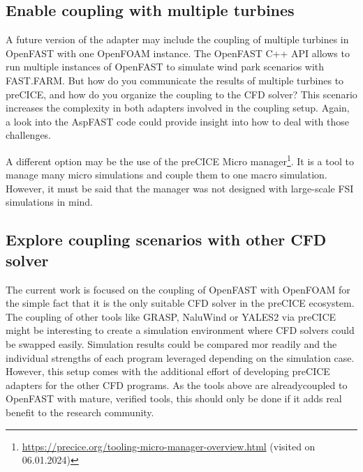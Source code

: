 \subsection{Enable coupling with multiple turbines}

A future version of the adapter may include the coupling of multiple turbines in OpenFAST with one OpenFOAM instance. The OpenFAST C++ API allows to run multiple instances of OpenFAST to simulate wind park scenarios with FAST.FARM. But how do you communicate the results of multiple turbines to preCICE, and how do you organize the coupling to the CFD solver? This scenario increases the complexity in both adapters involved in the coupling setup. Again, a look into the AspFAST code could provide insight into how to deal with those challenges.

A different option may be the use of the preCICE Micro manager\footnote{\url{https://precice.org/tooling-micro-manager-overview.html} (visited on 06.01.2024)}. It is a tool to manage many micro simulations and couple them to one macro simulation. However, it must be said that the manager was not designed with large-scale FSI simulations in mind.
\begin{comment}
\begin{itemize}
	\item OpenFAST C++ API allows to run multiple instances of OpenFAST for wind park scenarios
	\item How do you connect them to preCICE? 
	\item How do you define the different coupling scenarios?
	\item Possibly use the MacroMicro manager of preCICE to deal with the coupling of multiple domains\\
\end{itemize}
\end{comment}


\subsection{Explore coupling scenarios with other CFD solver}

The current work is focused on the coupling of OpenFAST with OpenFOAM for the simple fact that it is the only suitable CFD solver in the preCICE ecosystem. The coupling of other tools like GRASP, NaluWind or YALES2 via preCICE might be interesting to create a simulation environment where CFD solvers could be swapped easily. Simulation results could be compared mor readily and the individual strengths of each program leveraged depending on the simulation case. However, this setup comes with the additional effort of developing preCICE adapters for the other CFD programs. As the tools above are alreadycoupled to OpenFAST with mature, verified tools, this should only be done if it adds real benefit to the research community.

